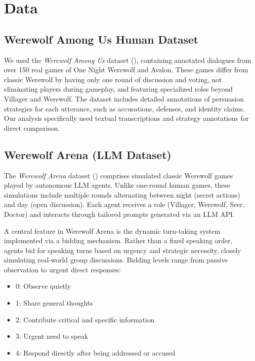 \documentclass[
  letterpaper,
  DIV=11,
  numbers=noendperiod,
  oneside]{scrreprt}
\providecommand{\tightlist}{%
  \setlength{\itemsep}{0pt}\setlength{\parskip}{0pt}}
\begin{document}
\section{Data}\label{data}

\subsection{Werewolf Among Us Human
Dataset}\label{werewolf-among-us-human-dataset}

We used the \emph{Werewolf Among Us} dataset
(),
containing annotated dialogues from over 150 real games of One Night
Werewolf and Avalon. These games differ from classic Werewolf by having
only one round of discussion and voting, not eliminating players during
gameplay, and featuring specialized roles beyond Villager and Werewolf.
The dataset includes detailed annotations of persuasion strategies for
each utterance, such as accusations, defenses, and identity claims. Our
analysis specifically used textual transcriptions and strategy
annotations for direct comparison.

\subsection{Werewolf Arena (LLM
Dataset)}\label{werewolf-arena-llm-dataset}

The \emph{Werewolf Arena} dataset
() comprises simulated classic Werewolf games played by autonomous
LLM agents. Unlike one-round human games, these simulations include
multiple rounds alternating between night (secret actions) and day (open
discussion). Each agent receives a role (Villager, Werewolf, Seer,
Doctor) and interacts through tailored prompts generated via an LLM API.

A central feature in Werewolf Arena is the dynamic turn-taking system
implemented via a bidding mechanism. Rather than a fixed speaking order,
agents bid for speaking turns based on urgency and strategic necessity,
closely simulating real-world group discussions. Bidding levels range
from passive observation to urgent direct responses:

\begin{itemize}
\tightlist
\item
  0: Observe quietly
\item
  1: Share general thoughts
\item
  2: Contribute critical and specific information
\item
  3: Urgent need to speak
\item
  4: Respond directly after being addressed or accused
\end{itemize}
\end{document}
